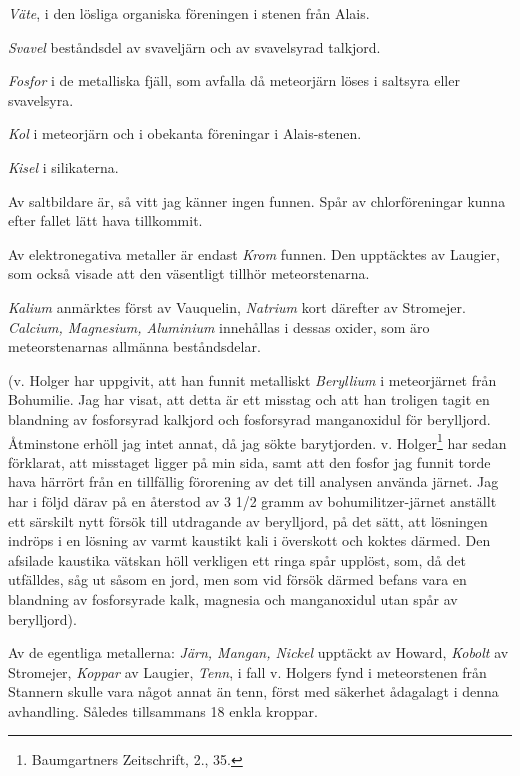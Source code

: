 \documentclass[a4paper, 12pt, oneside, swedish]{article}
\begin{document}
\emph{Väte}, i den lösliga organiska föreningen i stenen från Alais.

\emph{Svavel} beståndsdel av svaveljärn och av svavelsyrad talkjord.

\emph{Fosfor} i de metalliska fjäll, som avfalla då meteorjärn löses i saltsyra eller svavelsyra.

\emph{Kol} i meteorjärn och i obekanta föreningar i Alais-stenen.

\emph{Kisel} i silikaterna.

Av saltbildare är, så vitt jag känner ingen funnen. Spår av chlorföreningar kunna efter fallet lätt hava tillkommit.

Av elektronegativa metaller är endast \emph{Krom} funnen. Den upptäcktes av Laugier, som också visade att den väsentligt tillhör meteorstenarna.

\emph{Kalium} anmärktes först av Vauquelin, \emph{Natrium} kort därefter av Stromejer. \emph{Calcium, Magnesium, Aluminium} innehållas i dessas oxider, som äro meteorstenarnas allmänna beståndsdelar.

(v. Holger har uppgivit, att han funnit metalliskt \emph{Beryllium} i meteorjärnet från Bohumilie. Jag har visat, att detta är ett misstag och att han troligen tagit en blandning av fosforsyrad kalkjord och fosforsyrad manganoxidul för berylljord. Åtminstone erhöll jag intet annat, då jag sökte barytjorden. v. Holger\footnote{Baumgartners Zeitschrift, 2., 35.} har sedan förklarat, att misstaget ligger på min sida, samt att den fosfor jag funnit torde hava härrört från en tillfällig förorening av det till analysen använda järnet. Jag har i följd därav på en återstod av 3 1/2 gramm av bohumilitzer-järnet anställt ett särskilt nytt försök till utdragande av berylljord, på det sätt, att lösningen indröps i en lösning av varmt kaustikt kali i överskott och koktes därmed. Den afsilade kaustika vätskan höll verkligen ett ringa spår upplöst, som, då det utfälldes, såg ut såsom en jord, men som vid försök därmed befans vara en blandning av fosforsyrade kalk, magnesia och manganoxidul utan spår av berylljord).

Av de egentliga metallerna: \emph{Järn, Mangan, Nickel} upptäckt av Howard, \emph{Kobolt} av Stromejer, \emph{Koppar} av Laugier, \emph{Tenn}, i fall v. Holgers fynd i meteorstenen från Stannern skulle vara något annat än tenn, först med säkerhet ådagalagt i denna avhandling. Således tillsammans 18 enkla kroppar.
\end{document}
